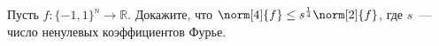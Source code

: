 Пусть $f\colon \{-1, 1\}^n \to \mathbb{R}$. Докажите, что $\norm[4]{f} \le s^{\frac{1}{4}} \norm[2]{f}$,
где $s$~--- число ненулевых коэффициентов Фурье.